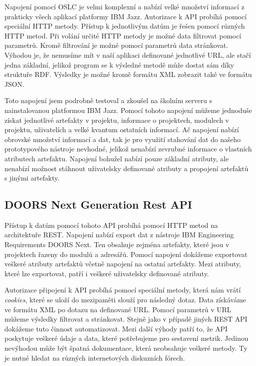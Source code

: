 \documentclass[czech,master]{diploma}
\begin{document}
Napojení pomocí OSLC je velmi komplexní a nabízí velké množství informací z prakticky všech aplikací platformy IBM Jazz. Autorizace k API probíhá pomocí speciální HTTP metody. Přístup k jednotlivým datům je řešen pomocí různých HTTP metod. Při volání určité HTTP metody je možné data filtrovat pomocí parametrů. Kromě filtrování je možné pomocí parametrů data stránkovat. Výhodou je, že nemusíme mít v naší aplikaci definované jednotlivé URL, ale stačí jedna základní, jelikož program se k výsledné metodě může dostat sám díky struktuře RDF. Výsledky je možné kromě formátu XML zobrazit také ve formátu JSON.

Toto napojení jsem podrobně testoval a zkoušel na školním serveru s nainstalovanou platformou IBM Jazz. Pomocí tohoto napojení můžeme jednoduše získat jednotlivé artefakty v projektu, informace o projektech, modulech v projektu, uživatelích a velké kvantum ostatních informací. Ač napojení nabízí obrovské množství informací a dat, tak je pro využití stahování dat do našeho prototypového nástroje nevhodné, jelikož nenabízí zevrubné informace o vlastních atributech artefaktu. Napojení bohužel nabízí pouze základní atributy, ale nenabízí možnost stáhnout uživatelsky definované atributy a propojení artefaktů s jinými artefakty.

\subsection{DOORS Next Generation Rest API}
Přístup k datům pomocí tohoto API probíhá pomocí HTTP metod na architektuře REST. Napojení nabízí export dat z nástroje IBM Engineering Requirements DOORS Next. Ten obsahuje zejména artefakty, které jsou v projektech řazeny do modulů a adresářů. Pomocí napojení dokážeme exportovat veškeré atributy artefaktů včetně napojení na ostatní artefakty. Mezi atributy, které lze exportovat, patří i veškeré uživatelsky definované atributy.

Autorizace připojení k API probíhá pomocí speciální metody, která nám vrátí \textit{cookies}, které se uloží do mezipaměti slouží pro následný dotaz. Data získáváme ve formátu XML po dotazu na definované URL. Pomocí parametrů v URL můžeme výsledky filtrovat a stránkovat. Stejně jako v případě jiných REST API dokážeme tuto činnost automatizovat. Mezi další výhody patří to, že API poskytuje veškeré údaje a data, které potřebujeme pro sestavení metrik. Jedinou nevýhodou může být špatná dokumentace, která neobsahuje veškeré metody. Ty je nutné hledat na různých internetových diskuzních fórech.
\end{document}
